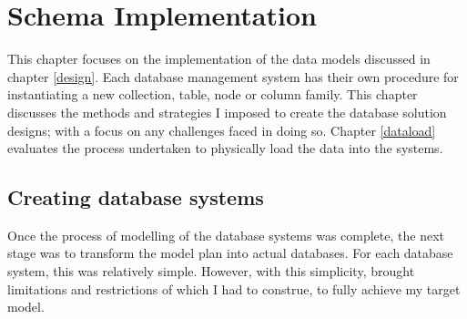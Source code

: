 \chapter{Schema Implementation}\label{implementation}
This chapter focuses on the implementation of the data models discussed in chapter \ref{design}. Each database management system has their own procedure for instantiating a new collection, table, node or column family. This chapter discusses the methods and strategies I imposed to create the database solution designs; with a focus on any challenges faced in doing so. Chapter \ref{dataload} evaluates the process undertaken to physically load the data into the systems.

\section{Creating database systems}\label{dbcreate}
Once the process of modelling of the database systems was complete, the next stage was to transform the model plan into actual databases. For each database system, this was relatively simple. However, with this simplicity, brought limitations and restrictions of which I had to construe, to fully achieve my target model.

